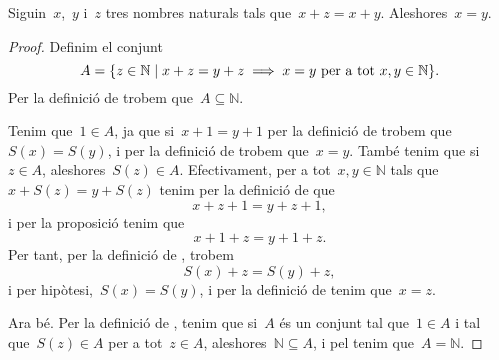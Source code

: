 \documentclass[../../main.tex]{subfiles}
\begin{document}
    \begin{theorem}
        \label{thm:podem tatxar per la suma nombres naturals}
        Siguin~\(x\),~\(y\) i~\(z\) tres nombres naturals tals que~\(x+z=x+y\).
        Aleshores~\(x=y\).
        \begin{proof}
            Definim el conjunt
            \[
                A=\{z\in\mathbb{N}\mid x+z=y+z\implies x=y\text{ per a tot }x,y\in\mathbb{N}\}.
            \]
            Per la definició de  trobem que~\(A\subseteq\mathbb{N}\).

            Tenim que~\(1\in A\), ja que si~\(x+1=y+1\) per la definició de  trobem que~\(S(x)=S(y)\), i per la definició de  trobem que~\(x=y\).
            També tenim que si~\(z\in A\), aleshores~\(S(z)\in A\).
            Efectivament, per a tot~\(x,y\in\mathbb{N}\) tals que~\(x+S(z)=y+S(z)\) tenim per la definició de  que
            \[
                x+z+1=y+z+1,
            \]
            i per la proposició  tenim que
            \[
                x+1+z=y+1+z.
            \]
            Per tant, per la definició de , trobem
            \[
                S(x)+z=S(y)+z,
            \]
            i per hipòtesi,~\(S(x)=S(y)\), i per la definició de  tenim que~\(x=z\).

            Ara bé.
            Per la definició de , tenim que si~\(A\) és un conjunt tal que~\(1\in A\) i tal que~\(S(z)\in A\) per a tot~\(z\in A\), aleshores~\(\mathbb{N}\subseteq A\), i pel  tenim que~\(A=\mathbb{N}\).
        \end{proof}
    \end{theorem}
\end{document}
